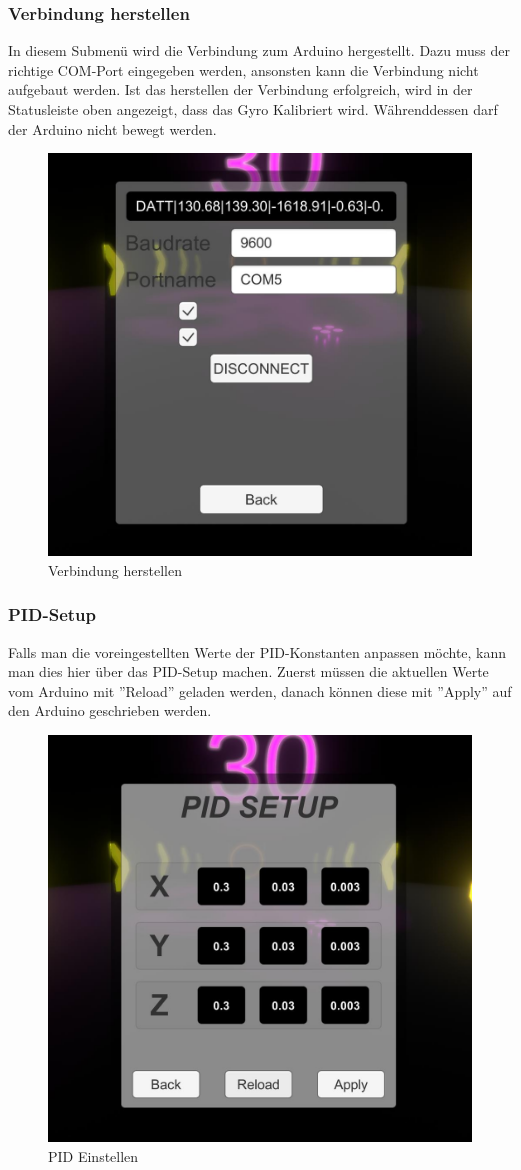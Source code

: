 \subsubsection{Verbindung herstellen}
In diesem Submenü wird die Verbindung zum Arduino hergestellt. Dazu muss der richtige COM-Port eingegeben werden, ansonsten kann die Verbindung nicht aufgebaut werden. Ist das herstellen der Verbindung erfolgreich, wird in der Statusleiste oben angezeigt, dass das Gyro Kalibriert wird. Währenddessen darf der Arduino nicht bewegt werden.
\begin{figure}[H]
  \begin{center}
    \includegraphics[width=0.45\linewidth]{content/images/connect.jpg}
    \caption{Verbindung herstellen}
  \end{center}
\end{figure}

\subsubsection{PID-Setup}
Falls man die voreingestellten Werte der PID-Konstanten anpassen möchte, kann man dies hier über das PID-Setup machen. Zuerst müssen die aktuellen Werte vom Arduino mit ''Reload'' geladen werden, danach können diese mit ''Apply'' auf den Arduino geschrieben werden.
\begin{figure}[H]
  \begin{center}
    \includegraphics[width=0.45\linewidth]{content/images/PID.jpg}
    \caption{PID Einstellen}
  \end{center}
\end{figure}

